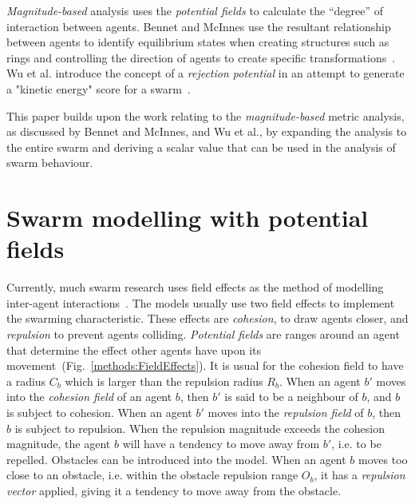 \documentclass{ieeeaccess}
\begin{document}
\textit{Magnitude-based} analysis uses the \textit{potential fields} to
calculate the ``degree'' of interaction between agents. Bennet and McInnes use
the resultant relationship between agents to identify equilibrium states when
creating structures such as rings and controlling the direction of agents to
create specific transformations~\cite{BM:09}. Wu et al. introduce the concept
of a \textit{rejection potential} in an attempt to generate a "kinetic energy"
score for a swarm~\cite{WCW:11}.

This paper builds upon the work relating to the \textit{magnitude-based} metric
analysis, as discussed by Bennet and McInnes, and Wu et al., by expanding the
analysis to the entire swarm and deriving a scalar value that can be used in the
analysis of swarm behaviour.

\section{Swarm modelling with potential fields}\label{Section:SwarmModelling}
Currently, much swarm research uses field effects as the method of modelling
inter-agent interactions~\cite{BAF:06, BAFVM:06, BM:09, APZDAMC:09, GP:02,
GP:04, GP:04a, GP:05, GP:11, MYP:09}. The models usually use two field effects
to implement the swarming characteristic. These effects are \textit{cohesion},
to draw agents closer, and \textit{repulsion} to prevent agents colliding.
\textit{Potential fields} are ranges around an agent that determine the effect
other agents have upon its movement~(Fig.~\ref{methods:FieldEffects}). It is
usual for the cohesion field to have a radius $C_b$ which is larger than the
repulsion radius $R_b$. When an agent $b'$ moves into the \textit{cohesion
field} of an agent $b$, then $b'$ is said to be a neighbour of $b$, and $b$ is
subject to cohesion. When an agent $b'$ moves into the \textit{repulsion field}
of $b$, then $b$ is subject to repulsion. When the repulsion magnitude exceeds
the cohesion magnitude, the agent $b$ will have a tendency to move away from
$b'$, i.e. to be repelled. Obstacles can be introduced into the model. When an
agent $b$ moves too close to an obstacle, i.e. within the obstacle repulsion
range $O_b$, it has a \textit{repulsion vector} applied, giving it a tendency
to move away from the obstacle.
\end{document}
